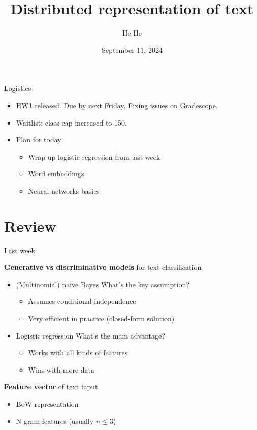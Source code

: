 \documentclass[usenames,dvipsnames,notes,11pt,aspectratio=169]{beamer}
\title[DS-GA-1011]{Distributed representation of text}
\author[He He]{He He
}
\institute[NYU]{
    \texttt{[image: ../figures/nyu-logo]}\\
}
\date{September 11, 2024}
\begin{document}
\begin{frame}
\titlepage
\end{frame}

\begin{frame}
    {Logistics}
    \begin{itemize}
        \item HW1 released. Due by next Friday. Fixing issues on Gradescope.
        \item Waitlist: class cap increased to 150.
        \item Plan for today:
            \begin{itemize}
                \item Wrap up logistic regression from last week 
                \item Word embeddings 
                \item Neural networks basics 
            \end{itemize}
    \end{itemize}
\end{frame}

\section{Review}
\begin{frame}
    {Last week}

    {\bf Generative vs discriminative models} for text classification\\
    \begin{itemize}
        \item (Multinomial) naive Bayes \hfill What's the key assumption?
            \pause
            \begin{itemize}
                \item Assumes conditional independence
                \item Very efficient in practice (closed-form solution)
            \end{itemize}
        \pause
        \item Logistic regression \hfill What's the main advantage?
            \pause
            \begin{itemize}
                \item Works with all kinds of features
                \item Wins with more data 
            \end{itemize}
    \end{itemize}

    \pause
    {\bf Feature vector} of text input\\
    \begin{itemize}
        \item BoW representation
        \item N-gram features (usually $n\le 3$)
    \end{itemize}
\end{frame}
\end{document}
